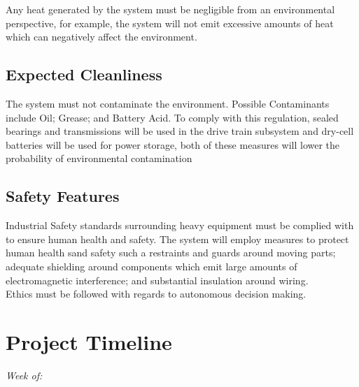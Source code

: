 \documentclass[12pt]{article}
\begin{document}
Any heat generated by the system must be negligible from an environmental perspective, for example, the system will not emit excessive amounts of heat which can negatively affect the environment. 
\subsection{Expected Cleanliness}
The system must not contaminate the environment. Possible Contaminants include Oil; Grease; and Battery Acid. To comply with this regulation, sealed bearings and transmissions will be used in the drive train subsystem and dry-cell batteries will be used for power storage, both of these measures will lower the probability of environmental contamination
\subsection{Safety Features}
Industrial Safety standards surrounding heavy equipment must be complied with to ensure human health and safety. The system will employ measures to protect human health sand safety such a restraints and guards around moving parts; adequate shielding around components which emit large amounts of electromagnetic interference; and substantial insulation around wiring. \\

Ethics must be followed with regards to autonomous decision making. 

\clearpage
\section{Project Timeline}

\textit{Week of:}
\end{document}
